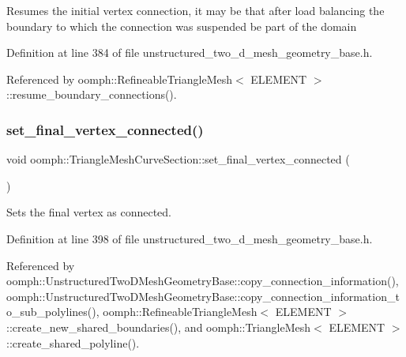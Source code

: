 Resumes the initial vertex connection, it may be that after load balancing the boundary to which the connection was suspended be part of the domain 

Definition at line 384 of file unstructured\+\_\+two\+\_\+d\+\_\+mesh\+\_\+geometry\+\_\+base.\+h.



Referenced by oomph\+::\+Refineable\+Triangle\+Mesh$<$ E\+L\+E\+M\+E\+N\+T $>$\+::resume\+\_\+boundary\+\_\+connections().

\mbox{\label{classoomph_1_1TriangleMeshCurveSection_abcdf60aacf4153498fe4dfa0821691d7}} 
\subsubsection{\texorpdfstring{set\+\_\+final\+\_\+vertex\+\_\+connected()}{set\_final\_vertex\_connected()}}
{\footnotesize\ttfamily void oomph\+::\+Triangle\+Mesh\+Curve\+Section\+::set\+\_\+final\+\_\+vertex\+\_\+connected (\begin{DoxyParamCaption}{ }\end{DoxyParamCaption})\hspace{0.3cm}{\ttfamily [inline]}}



Sets the final vertex as connected. 



Definition at line 398 of file unstructured\+\_\+two\+\_\+d\+\_\+mesh\+\_\+geometry\+\_\+base.\+h.



Referenced by oomph\+::\+Unstructured\+Two\+D\+Mesh\+Geometry\+Base\+::copy\+\_\+connection\+\_\+information(), oomph\+::\+Unstructured\+Two\+D\+Mesh\+Geometry\+Base\+::copy\+\_\+connection\+\_\+information\+\_\+to\+\_\+sub\+\_\+polylines(), oomph\+::\+Refineable\+Triangle\+Mesh$<$ E\+L\+E\+M\+E\+N\+T $>$\+::create\+\_\+new\+\_\+shared\+\_\+boundaries(), and oomph\+::\+Triangle\+Mesh$<$ E\+L\+E\+M\+E\+N\+T $>$\+::create\+\_\+shared\+\_\+polyline().

\mbox{\label{classoomph_1_1TriangleMeshCurveSection_af14d50cd734c6dc02c7fa0314dfadf68}} 

